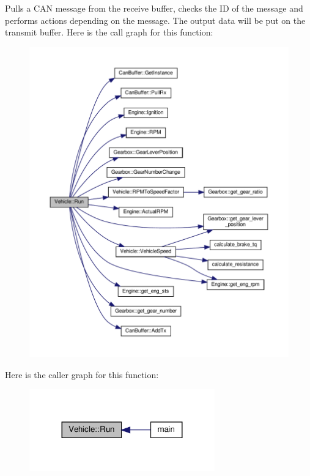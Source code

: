 Pulls a C\+AN message from the receive buffer, checks the ID of the message and performs actions depending on the message. The output data will be put on the transmit buffer. Here is the call graph for this function\+:
\nopagebreak
\begin{figure}[H]
\begin{center}
\leavevmode
\includegraphics[width=350pt]{classVehicle_a407e09d1ff69f43d3c4aa77f4f32a51c_cgraph}
\end{center}
\end{figure}
Here is the caller graph for this function\+:
\nopagebreak
\begin{figure}[H]
\begin{center}
\leavevmode
\includegraphics[width=227pt]{classVehicle_a407e09d1ff69f43d3c4aa77f4f32a51c_icgraph}
\end{center}
\end{figure}
\mbox{\label{classVehicle_a0967229be7b0b40b3f84c86942e43a52}} 
